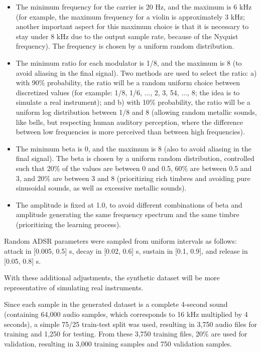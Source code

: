 \documentclass[10pt,conference]{IEEEtran}
\begin{document}
\begin{itemize}
    \item The minimum frequency for the carrier is 20 Hz, and the maximum is 6 kHz (for example, the maximum frequency for a violin is approximately 3 kHz; another important aspect for this maximum choice is that it is necessary to stay under 8 kHz due to the output sample rate, because of the Nyquist frequency). The frequency is chosen by a uniform random distribution.
    \item The minimum ratio for each modulator is 1/8, and the maximum is 8 (to avoid aliasing in the final signal). Two methods are used to select the ratio: a) with 90\% probability, the ratio will be a random uniform choice between discretized values (for example: 1/8, 1/6, ..., 2, 3, 54, ..., 8; the idea is to simulate a real instrument); and b) with 10\% probability, the ratio will be a uniform log distribution between 1/8 and 8 (allowing random metallic sounds, like bells, but respecting human auditory perception, where the difference between low frequencies is more perceived than between high frequencies).
    \item The minimum beta is 0, and the maximum is 8 (also to avoid aliasing in the final signal). The beta is chosen by a uniform random distribution, controlled such that 20\% of the values are between 0 and 0.5, 60\% are between 0.5 and 3, and 20\% are between 3 and 8 (prioritizing rich timbres and avoiding pure sinusoidal sounds, as well as excessive metallic sounds).
    \item The amplitude is fixed at 1.0, to avoid different combinations of beta and amplitude generating the same frequency spectrum and the same timbre (prioritizing the learning process).
\end{itemize}

Random ADSR parameters were sampled from uniform intervals as follows: attack in [0.005, 0.5] s, decay in [0.02, 0.6] s, sustain in [0.1, 0.9], and release in [0.05, 0.8] s.

With these additional adjustments, the synthetic dataset will be more representative of simulating real instruments.

Since each sample in the generated dataset is a complete 4-second sound (containing 64,000 audio samples, which corresponds to 16 kHz multiplied by 4 seconds), a simple 75/25 train-test split was used, resulting in 3,750 audio files for training and 1,250 for testing. From these 3,750 training files, 20\% are used for validation, resulting in 3,000 training samples and 750 validation samples.
\end{document}
